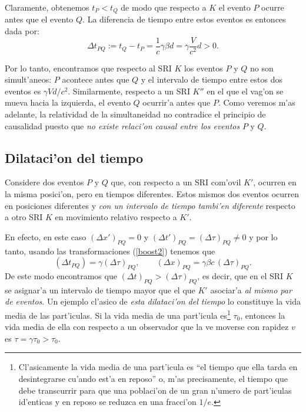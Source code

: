 Claramente, obtenemos $t_P<t_Q$ de modo que respecto a $K$ el evento $P$ ocurre antes que el evento $Q$. La diferencia de tiempo entre estos eventos es entonces dada por:
\begin{equation}
 \Delta t_{PQ}:=t_Q-t_P=\frac{1}{c}\gamma \beta d=\gamma\frac{V}{c^2}d >0.
\end{equation}


Por lo tanto, encontramos que respecto al SRI $K$ los eventos $P$ y $Q$ no son simult'aneos: $P$ acontece antes que $Q$ y el intervalo de tiempo entre estos dos eventos es $\gamma{V}d/{c^2}$. Similarmente, respecto a un SRI $K''$ en el que el vag'on se mueva hacia la izquierda, el evento $Q$ ocurrir'a antes que $P$. Como veremos m'as adelante, la relatividad de la simultaneidad no contradice el principio de causalidad puesto que \textit{no existe relaci'on causal entre los eventos} $P$ y $Q$.


\subsection{Dilataci'on del tiempo}
Considere dos eventos $P$ y $Q$ que, con respecto a un SRI com'ovil $K'$, ocurren en la misma posici'on, pero en tiempos diferentes. Estos mismos dos eventos ocurren en posiciones diferentes y \textit{con un intervalo de tiempo tambi'en diferente} respecto a otro SRI $K$ en movimiento relativo respecto a $K'$. 

En efecto, en este caso $(\Delta x')_{PQ}=0$ y $(\Delta t')_{PQ}=(\Delta\tau)_{PQ}\neq 0$ y por lo tanto, usando las transformaciones (\ref{boost2}) tenemos que
\begin{equation}
(\Delta t_{PQ})=\gamma (\Delta\tau)_{PQ}, \qquad (\Delta x)_{PQ}=\gamma\beta c\,(\Delta\tau)_{PQ}.
\end{equation}
De este modo encontramos que $(\Delta t)_{PQ}>(\Delta\tau)_{PQ}$, es decir, que en el SRI $K$ se asignar'a un intervalo de tiempo mayor que el que $K'$ asociar'a \textit{al mismo par de eventos}. Un ejemplo cl'asico de \textit{esta dilataci'on del tiempo} lo constituye la vida media de las part'iculas. Si la vida media de una part'icula es\footnote{Cl'asicamente la vida media de una part'icula es ``el tiempo que ella tarda en desintegrarse cu'ando est'a en reposo'' o, m'as precisamente, el tiempo que debe transcurrir para que una poblaci'on de un gran n'umero de part'iculas id'enticas y en reposo se reduzca en una fracci'on $1/e$.} $\tau_0$, entonces la vida media de ella con respecto a un observador que la ve moverse con rapidez $v$ es $\tau=\gamma\tau_0 >\tau_0$.

